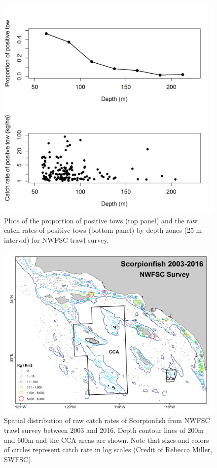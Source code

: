 \documentclass[12pt,]{article}
\begin{document}
\FloatBarrier

\begin{figure}[htbp]
\centering
\includegraphics{Figures/NWFSCtrawl_posdepth.png}
\caption{Plots of the proportion of positive tows (top panel) and the
raw catch rates of positive tows (bottom panel) by depth zones (25 m
interval) for NWFSC trawl survey.
\label{fig:Fleet8_NWFSCtrawl_posdepth}}
\end{figure}

\FloatBarrier

\begin{figure}[htbp]
\centering
\includegraphics{Figures/NWFSCtrawl_map.png}
\caption{Spatial distribution of raw catch rates of Scorpionfish from
NWFSC trawl survey between 2003 and 2016. Depth contour lines of 200m
and 600m and the CCA areas are shown. Note that sizes and colors of
circles represent catch rate in log scales (Credit of Rebecca Miller,
SWFSC). \label{fig:Fleet8_NWFSCtrawl_map}}
\end{figure}
\end{document}
